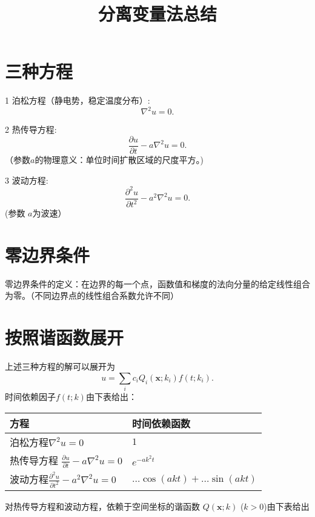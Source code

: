 \documentclass[10pt,CJK]{article}
\begin{document}
\bch
\title{分离变量法总结}

\section{三种方程}
\bitem
\item[1]{泊松方程（静电势，稳定温度分布）:
$$\nabla^2 u = 0.$$
}
\item[2]{热传导方程:
$$\frac{\partial u}{\partial t}- a\nabla^2 u = 0.$$
（参数$a$的物理意义：单位时间扩散区域的尺度平方。)
}
\item[3]{波动方程:
$$\frac{\partial^2 u}{\partial t^2}- a^2\nabla^2 u = 0.$$
(参数 $a$为波速）
}
\eitem
\section{零边界条件}
零边界条件的定义：在边界的每一个点，函数值和梯度的法向分量的给定线性组合为零。（不同边界点的线性组合系数允许不同）

\section{按照谐函数展开}

上述三种方程的解可以展开为
$$ u = \sum_i c_i Q_i(\mathbf{x}; k_i) f(t;k_i). $$
时间依赖因子$f(t; k)$由下表给出：

\begin{tabular}{p{}|p{}}
  \hline
  \hline
  方程 & 时间依赖函数 \\
  \hline
  泊松方程$\nabla^2 u = 0$ & $1$ \\
  热传导方程 $\frac{\partial u}{\partial t}- a\nabla^2 u = 0$ & $e^{-ak^2t}$ \\
  波动方程$\frac{\partial^2 u}{\partial t^2}- a^2\nabla^2 u = 0$ & $\ldots\cos(akt)+\ldots\sin(akt)$ \\  
  \hline
\end{tabular}



对热传导方程和波动方程，依赖于空间坐标的谐函数 $Q(\mathbf{x}; k)$ ($k>0$)由下表给出
\end{document}
